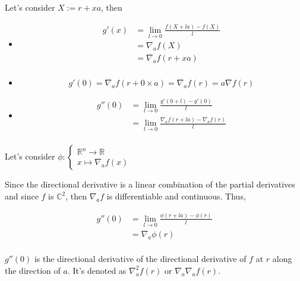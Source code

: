 \documentclass[12pt]{article}
\begin{document}
Let's consider $X := r+xa$, then

\begin{itemize}

\item
    \begin{equation*}
        \begin{split}
            g'(x) &= \lim_{l \rightarrow 0} \frac{f(X+la)-f(X)}{l} \\
            &=  \nabla_{a} f(X) \\
            &=  \nabla_{a} f(r+xa) \\
        \end{split}
    \end{equation*}
    
\item
    $$
    g'(0) = \nabla_{a} f(r+0 \times a) =  \nabla_{a} f(r) = a \nabla f(r)
    $$

\item

    \begin{equation*}
        \begin{split}
            g''(0) &= \lim_{l \rightarrow 0} \frac{g'(0+l)-g'(0)}{l} \\
            &= \lim_{l \rightarrow 0} \frac{\nabla_{a} f(r+la)-\nabla_{a} f(r)}{l} \\
        \end{split}
    \end{equation*}

\end{itemize}

Let's consider 
$
\phi : \begin{cases}
\mathbb{R}^n \rightarrow \mathbb{R} \\
x \mapsto \nabla_{a} f(x)
\end{cases}
$

Since the directional derivative is a linear combination of the partial derivatives and since $f$ is $\mathbb{C}^2$, then $\nabla_{a} f$ is differentiable and continuous. Thus, 

\begin{equation*}
    \begin{split}
    g''(0) &= \lim_{l \rightarrow 0} \frac{\phi(r+la)-\phi(r)}{l} \\
    &= \nabla_{a} \phi(r) \\
    \end{split}
\end{equation*}

$g''(0)$ is the directional derivative of the directional derivative of $f$ at $r$ along the direction of $a$. It's denoted as $\nabla_{a}^2 f(r)$ or $\nabla_{a} \nabla_{a} f(r)$.
\end{document}
